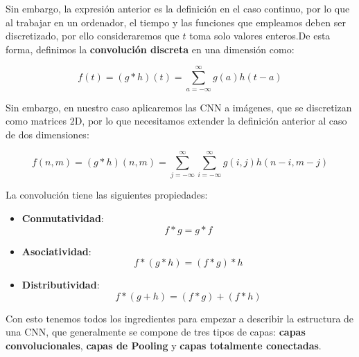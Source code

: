         \medskip

        \noindent Sin embargo, la expresión anterior es la definición en el caso continuo, por lo que al trabajar en un ordenador, el tiempo y las funciones que empleamos deben ser discretizado, por ello consideraremos que $t$ toma solo valores enteros.De esta forma, definimos la \textbf{convolución discreta} en una dimensión como: 

        \begin{equation}
            f(t)= (g \ast h)(t) = \sum_{a=-\infty}^\infty g(a) h(t-a)
        \end{equation}

        \medskip

        \noindent Sin embargo, en nuestro caso aplicaremos las CNN a imágenes, que se discretizan como matrices $2$D, por lo que necesitamos extender la definición anterior al caso de dos dimensiones: 

        \begin{equation}
            f(n,m)= (g \ast h)(n,m) = \sum_{j=-\infty}^\infty \sum_{i=-\infty}^\infty g(i,j) h(n-i,m-j)
        \end{equation}

        \noindent La convolución tiene las siguientes propiedades: 

        \begin{itemize}
            \item \textbf{Conmutatividad}: 
            \begin{equation}
                f \ast g = g \ast f
            \end{equation}
            \item \textbf{Asociatividad}: 
            \begin{equation}
                f \ast (g \ast h) = (f \ast g) \ast h
            \end{equation}
            \item \textbf{Distributividad}: 
            \begin{equation}
                f \ast (g + h)= (f\ast g) + (f \ast h)
            \end{equation}
        \end{itemize}

        \noindent Con esto tenemos todos los ingredientes para empezar a describir la estructura de una CNN, que generalmente se compone de tres tipos de capas: \textbf{capas convolucionales}, \textbf{capas de Pooling} y \textbf{capas totalmente conectadas}.

